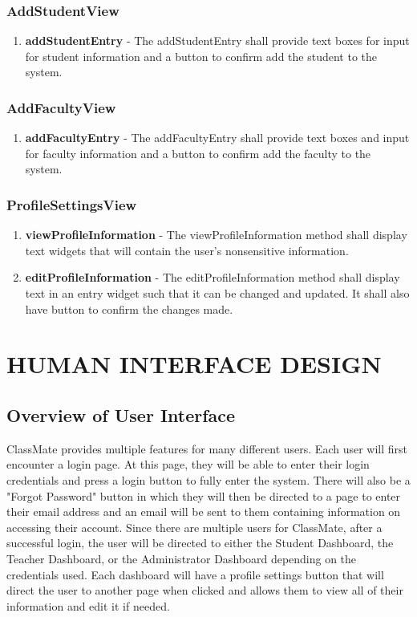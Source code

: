 \documentclass[letterpaper,12pt,oneside,listof=totoc]{scrreprt}
\begin{document}
\subsection{AddStudentView}
\begin{enumerate}
    \item \textbf{addStudentEntry} - The addStudentEntry shall provide text boxes for input for student information and a button to confirm add the student to the system.
\end{enumerate}

\subsection{AddFacultyView}
\begin{enumerate}
    \item \textbf{addFacultyEntry} - The addFacultyEntry shall provide text boxes and input for faculty information and a button to confirm add the faculty to the system.
\end{enumerate}

\subsection{ProfileSettingsView}
\begin{enumerate}
    \item \textbf{viewProfileInformation} - The viewProfileInformation method shall display text widgets that will contain the user's nonsensitive information.
    \item \textbf{editProfileInformation} - The editProfileInformation method shall display text in an entry widget such that it can be changed and updated. It shall also have button to confirm the changes made.
\end{enumerate}

\chapter{HUMAN INTERFACE DESIGN}

\section{Overview of User Interface}

ClassMate provides multiple features for many different users. Each user will first encounter a login page. At this page, they will be able to enter their login credentials and press a login button to fully enter the system. There will also be a "Forgot Password" button in which they will then be directed to a page to enter their email address and an email will be sent to them containing information on accessing their account. Since there are multiple users for ClassMate, after a successful login, the user will be directed to either the Student Dashboard, the Teacher Dashboard, or the Administrator Dashboard depending on the credentials used. Each dashboard will have a profile settings button that will direct the user to another page when clicked and allows them to view all of their information and edit it if needed. 
\end{document}
